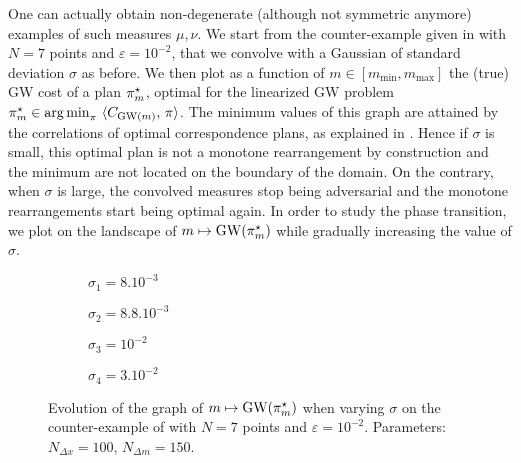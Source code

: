                 One can actually obtain non-degenerate (although not symmetric anymore) examples of such measures $\mu,\nu$. We start from the counter-example given in \cite{beinert2022assignment} with $N=7$ points and $\varepsilon=10^{-2}$,
                that we convolve with a Gaussian of standard deviation $\sigma$ as before. We then plot as a function of $m\in[m_\text{min},m_\text{max}]$ the (true) GW cost of a plan $\pi_m^\star$, optimal for the linearized GW problem $\pi^\star_m\in\operatorname*{arg\,min}_{\pi}\ \langle C_{\operatorname{GW}(m)},\,\pi\rangle$. The minimum values of this graph are attained by the correlations of optimal correspondence plans, as explained in . Hence if $\sigma$ is small, this optimal plan is not a monotone rearrangement by construction and the minimum are not located on the boundary of the domain.
                On the contrary, when $\sigma$ is large, the convolved measures stop being adversarial and the monotone rearrangements start being optimal again. In order to study the phase transition, we plot on  the landscape of $m\mapsto \operatorname{GW}(\pi^\star_m)$ while gradually increasing the value of $\sigma$.

                \begin{figure}[h]
                    \centering
                    \begin{subfigure}[b]{.24\linewidth}
                        \centering
                        
                        \vspace{-6mm}
                        \caption*{$\sigma_1=8.10^{-3}$}
                    \end{subfigure}
                    \begin{subfigure}[b]{.24\linewidth}
                        \centering
                        
                        \vspace{-6mm}
                        \caption*{$\sigma_2=8.8.10^{-3}$}
                    \end{subfigure}
                    \begin{subfigure}[b]{.24\linewidth}
                        \centering
                        
                        \vspace{-6mm}
                        \caption*{$\sigma_3=10^{-2}$}
                    \end{subfigure}
                    \begin{subfigure}[b]{.24\linewidth}
                        \centering
                        
                        \vspace{-6mm}
                        \caption*{$\sigma_4=3.10^{-2}$}
                    \end{subfigure}
                    \caption{Evolution of the graph of $m\mapsto \operatorname{GW}(\pi^\star_m)$ when varying $\sigma$ on the counter-example of \cite{beinert2022assignment} with $N=7$ points and $\varepsilon=10^{-2}$. Parameters: $N_{\Delta x}=100$, $N_{\Delta m}=150$.}
                    \label{fig:no-stab}
                \end{figure}

